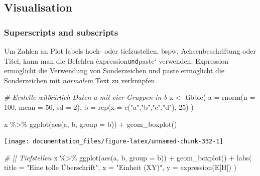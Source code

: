 \documentclass[
]{article}
\newenvironment{Shaded}{\begin{snugshade}}{\end{snugshade}}
\newcommand{\AttributeTok}[1]{\textcolor[rgb]{0.77,0.63,0.00}{#1}}
\newcommand{\CommentTok}[1]{\textcolor[rgb]{0.56,0.35,0.01}{\textit{#1}}}
\newcommand{\DecValTok}[1]{\textcolor[rgb]{0.00,0.00,0.81}{#1}}
\newcommand{\FunctionTok}[1]{\textcolor[rgb]{0.00,0.00,0.00}{#1}}
\newcommand{\NormalTok}[1]{#1}
\newcommand{\OtherTok}[1]{\textcolor[rgb]{0.56,0.35,0.01}{#1}}
\newcommand{\SpecialCharTok}[1]{\textcolor[rgb]{0.00,0.00,0.00}{#1}}
\newcommand{\StringTok}[1]{\textcolor[rgb]{0.31,0.60,0.02}{#1}}
\begin{document}
\hypertarget{visualisation}{%
\subsection{Visualisation}\label{visualisation}}

\hypertarget{superscripts-and-subscripts}{%
\subsubsection{Superscripts and subscripts}\label{superscripts-and-subscripts}}

Um Zahlen an Plot labels hoch- oder tiefzustellen, bspw. Achsenbeschriftung oder Titel, kann man die Befehlen èxpression\texttt{und}paste` verwenden. Expression ermöglicht die Verwendung von Sonderzeichen und paste ermöglicht die Sonderzeichen mit \emph{normalem} Text zu verknüpfen.

\begin{Shaded}
\begin{Highlighting}[]
\CommentTok{\# Erstelle willkürlich Daten a mit vier Gruppen in b}
\NormalTok{x }\OtherTok{\textless{}{-}} \FunctionTok{tibble}\NormalTok{(}
  \AttributeTok{a =} \FunctionTok{rnorm}\NormalTok{(}\AttributeTok{n =} \DecValTok{100}\NormalTok{, }\AttributeTok{mean =} \DecValTok{50}\NormalTok{, }\AttributeTok{sd =} \DecValTok{2}\NormalTok{),}
  \AttributeTok{b =} \FunctionTok{rep}\NormalTok{(}\AttributeTok{x =} \FunctionTok{c}\NormalTok{(}\StringTok{"a"}\NormalTok{,}\StringTok{"b"}\NormalTok{,}\StringTok{"c"}\NormalTok{,}\StringTok{"d"}\NormalTok{), }\DecValTok{25}\NormalTok{)}
\NormalTok{)}

\NormalTok{x }\SpecialCharTok{\%\textgreater{}\%}
  \FunctionTok{ggplot}\NormalTok{(}\FunctionTok{aes}\NormalTok{(a, b, }\AttributeTok{group =}\NormalTok{ b)) }\SpecialCharTok{+}
  \FunctionTok{geom\_boxplot}\NormalTok{()}
\end{Highlighting}
\end{Shaded}

\begin{center}\texttt{[image: documentation\_files/figure-latex/unnamed-chunk-332-1]} \end{center}

\begin{Shaded}
\begin{Highlighting}[]

\CommentTok{\# [] Tiefstellen}
\NormalTok{x }\SpecialCharTok{\%\textgreater{}\%}
  \FunctionTok{ggplot}\NormalTok{(}\FunctionTok{aes}\NormalTok{(a, b, }\AttributeTok{group =}\NormalTok{ b)) }\SpecialCharTok{+}
  \FunctionTok{geom\_boxplot}\NormalTok{() }\SpecialCharTok{+}
  \FunctionTok{labs}\NormalTok{(}
    \AttributeTok{title =} \StringTok{"Eine tolle Überschrift"}\NormalTok{,}
    \AttributeTok{x =} \StringTok{"Einheit (XY)"}\NormalTok{,}
    \AttributeTok{y =} \FunctionTok{expression}\NormalTok{(E[H])}
\NormalTok{  )}
\end{Highlighting}
\end{Shaded}
\end{document}
